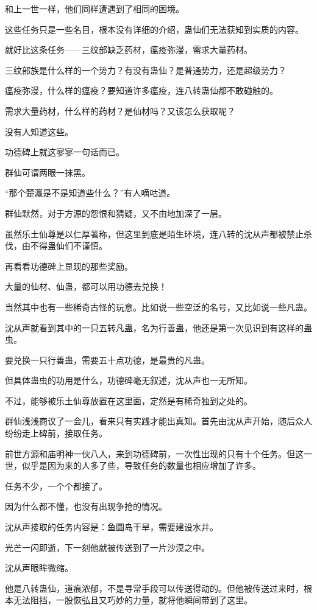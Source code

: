 \begin{this_body}
和上一世一样，他们同样遭遇到了相同的困境。

这些任务只是一些名目，根本没有详细的介绍，蛊仙们无法获知到实质的内容。

就好比这条任务——三纹部缺乏药材，瘟疫弥漫，需求大量药材。

三纹部族是什么样的一个势力？有没有蛊仙？是普通势力，还是超级势力？

瘟疫弥漫，什么样的瘟疫？要知道许多瘟疫，连八转蛊仙都不敢碰触的。

需求大量药材，什么样的药材？是仙材吗？又该怎么获取呢？

没有人知道这些。

功德碑上就这寥寥一句话而已。

群仙可谓两眼一抹黑。

“那个楚瀛是不是知道些什么？”有人嘀咕道。

群仙默然，对于方源的怨恨和猜疑，又不由地加深了一层。

虽然乐土仙尊是以仁厚著称，但这里到底是陌生环境，连八转的沈从声都被禁止杀伐，由不得蛊仙们不谨慎。

再看看功德碑上显现的那些奖励。

大量的仙材、仙蛊，都可以用功德去兑换！

当然其中也有一些稀奇古怪的玩意。比如说一些空泛的名号，又比如说一些凡蛊。

沈从声就看到其中的一只五转凡蛊，名为行善蛊，他还是第一次见识到有这样的蛊虫。

要兑换一只行善蛊，需要五十点功德，是最贵的凡蛊。

但具体蛊虫的功用是什么，功德碑毫无叙述，沈从声也一无所知。

不过，能够被乐土仙尊放置在这里面，定然是有稀奇独到之处的。

群仙浅浅商议了一会儿，看来只有实践才能出真知。首先由沈从声开始，随后众人纷纷走上碑前，接取任务。

前世方源和庙明神一伙八人，来到功德碑前，一次性出现的只有十个任务。但这一世，似乎是因为来的人多了些，导致任务的数量也相应增加了许多。

任务不少，一个个都接了。

因为什么都不懂，也没有出现争抢的情况。

沈从声接取的任务内容是：鱼圆岛干旱，需要建设水井。

光芒一闪即逝，下一刻他就被传送到了一片沙漠之中。

沈从声眼眸微缩。

他是八转蛊仙，道痕浓郁，不是寻常手段可以传送得动的。但他被传送过来时，根本无法阻挡，一股恢弘且又巧妙的力量，就将他瞬间带到了这里。


\end{this_body}

